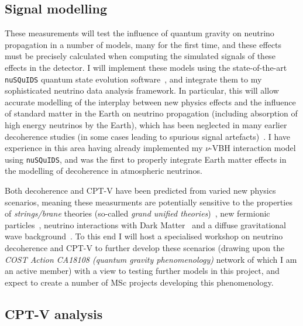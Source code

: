 \documentclass[a4paper,11pt]{article}
\begin{document}

\subsection{Signal modelling}

These measurements will test the influence of quantum gravity on neutrino propagation in a number of models, many for the first time, and these effects must be precisely calculated when computing the simulated signals of these effects in the detector. I will implement these models using the state-of-the-art \texttt{nuSQuIDS} quantum state evolution software~\cite{Delgado:2014kpa, nusquidsGIT}, and integrate them to my sophisticated neutrino data analysis framework. In particular, this will allow accurate modelling of the interplay between new physics effects and the influence of standard matter in the Earth on neutrino propagation (including absorption of high energy neutrinos by the Earth), which has been neglected in many earlier decoherence studies (in some cases leading to spurious signal artefacts)~\cite{PhysRevD.97.115017}. I have experience in this area having already implemented my $\nu$-VBH interaction model using \texttt{nuSQuIDS}, and was the first to properly integrate Earth matter effects in the modelling of decoherence in atmospheric neutrinos.

Both decoherence and CPT-V have been predicted from varied new physics scenarios, meaning these measurments are potentially sensitive to the properties of \textit{strings/brane} theories (so-called \textit{grand unified theories})~\cite{Mavromatos2010, AmelinoCamelia:2008qg}, new fermionic particles~\cite{Hellmann:2021jyz}, neutrino interactions with Dark Matter~\cite{1909.11271, EPJC802020} and a diffuse gravitational wave background~\cite{PhysRevD.100.096014}.  To this end I will host a specialised workshop on neutrino decoherence and CPT-V to further develop these scenarios (drawing upon the \textit{COST Action CA18108 (quantum gravity phenomenology)} network of which I am an active member) with a view to testing further models in this project, and expect to create a number of MSc projects developing this phenomenology. \\


\subsection{CPT-V analysis}
\end{document}
